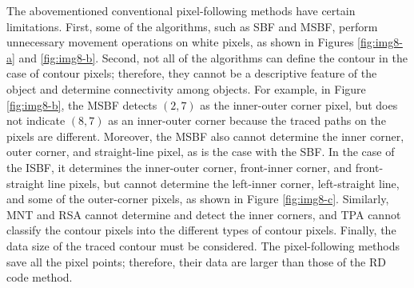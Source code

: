 
The abovementioned conventional pixel-following methods have certain limitations. First, some of the algorithms, such as SBF and MSBF, perform unnecessary movement operations on white pixels, as shown in Figures \ref{fig:img8-a} and \ref{fig:img8-b}. Second, not all of the algorithms can define the contour in the case of contour pixels; therefore, they cannot be a descriptive feature of the object and determine connectivity among objects. For example, in Figure \ref{fig:img8-b}, the MSBF detects $(2, 7)$ as the inner-outer corner pixel, but does not indicate $(8, 7)$ as an inner-outer corner because the traced paths on the pixels are different. Moreover, the MSBF also cannot determine the inner corner, outer corner, and straight-line pixel, as is the case with the SBF. In the case of the ISBF, it determines the inner-outer corner, front-inner corner, and front-straight line pixels, but cannot determine the left-inner corner, left-straight line, and some of the outer-corner pixels, as shown in Figure \ref{fig:img8-c}. Similarly, MNT and RSA cannot determine and detect the inner corners, and TPA cannot classify the contour pixels into the different types of contour pixels. Finally, the data size of the traced contour must be considered. The pixel-following methods save all the pixel points; therefore, their data are larger than those of the RD code method.


